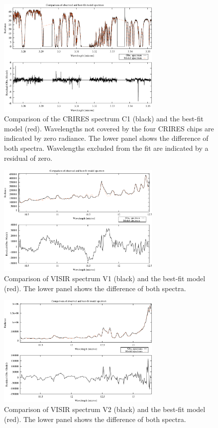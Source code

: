 \begin{figure}
\centering
\includegraphics[width=0.7\textwidth,clip=true]
{figures/molecfit_crires_fit.pdf}
\caption[]{Comparison of the CRIRES spectrum C1 (black) and the best-fit model
(red). Wavelengths not covered by the four CRIRES chips are indicated by zero
radiance. The lower panel shows the difference of both spectra. Wavelengths
excluded from the fit are indicated by a residual of zero.}
\label{fig:crires}
\end{figure}

\begin{figure}
\centering
\includegraphics[width=0.7\textwidth,clip=true]
{figures/molecfit_VR_091024A_114_fit.pdf}
\caption[]{Comparison of VISIR spectrum V1 (black) and the best-fit model
(red). The lower panel shows the difference of both spectra.}
\label{fig:visir1}
\end{figure}

\begin{figure}
\centering
\includegraphics[width=0.7\textwidth,clip=true]
{figures/molecfit_VR_091024A_122_fit.pdf}
\caption[]{Comparison of VISIR spectrum V2 (black) and the best-fit model
(red). The lower panel shows the difference of both spectra.}
\label{fig:visir2}
\end{figure}

